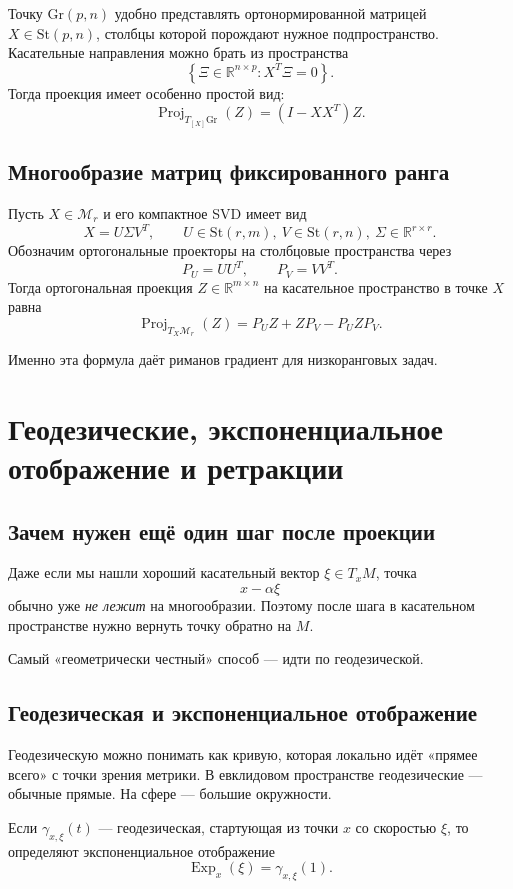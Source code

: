 \documentclass[12pt,a4paper]{article}
\theoremstyle{rudef}
\theoremstyle{ruplain}
\newcommand{\R}{\mathbb{R}}
\newcommand{\Proj}{\operatorname{Proj}}
\newcommand{\St}{\mathrm{St}}
\newcommand{\Gr}{\mathrm{Gr}}
\newcommand{\Exp}{\operatorname{Exp}}
\newcommand{\set}[1]{\left\{#1\right\}}
\begin{document}
Точку $\Gr(p,n)$ удобно представлять ортонормированной матрицей $X\in \St(p,n)$, столбцы которой порождают нужное подпространство. Касательные направления можно брать из пространства
\[
\set{\Xi\in \R^{n\times p}: X^T\Xi=0}.
\]
Тогда проекция имеет особенно простой вид:
\[
\boxed{\ \Proj_{T_{[X]}\Gr}(Z) = (I-XX^T)Z.\ }
\]

\subsection{Многообразие матриц фиксированного ранга}

Пусть $X\in \mathcal M_r$ и его компактное SVD имеет вид
\[
X=U\Sigma V^T,
\qquad U\in \St(r,m),\ V\in \St(r,n),\ \Sigma\in \R^{r\times r}.
\]
Обозначим ортогональные проекторы на столбцовые пространства через
\[
P_U=UU^T,\qquad P_V=VV^T.
\]
Тогда ортогональная проекция $Z\in \R^{m\times n}$ на касательное пространство в точке $X$ равна
\[
\boxed{\ \Proj_{T_X\mathcal M_r}(Z)=P_UZ + ZP_V - P_U Z P_V.\ }
\]

Именно эта формула даёт риманов градиент для низкоранговых задач.

\section{Геодезические, экспоненциальное отображение и ретракции}

\subsection{Зачем нужен ещё один шаг после проекции}

Даже если мы нашли хороший касательный вектор $\xi\in T_xM$, точка
\[
x-\alpha \xi
\]
обычно уже \emph{не лежит} на многообразии. Поэтому после шага в касательном пространстве нужно вернуть точку обратно на $M$.

Самый «геометрически честный» способ --- идти по геодезической.

\subsection{Геодезическая и экспоненциальное отображение}

Геодезическую можно понимать как кривую, которая локально идёт «прямее всего» с точки зрения метрики. В евклидовом пространстве геодезические --- обычные прямые. На сфере --- большие окружности.

Если $\gamma_{x,\xi}(t)$ --- геодезическая, стартующая из точки $x$ со скоростью $\xi$, то определяют экспоненциальное отображение
\[
\Exp_x(\xi)=\gamma_{x,\xi}(1).
\]
\end{document}
